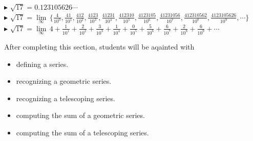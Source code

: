 \documentclass{ximera}
\begin{document}
$\blacktriangleright$  $\sqrt{17} = 0.123105626\cdots$ \\



$\blacktriangleright$ $\sqrt{17} =  \lim\limits_{\infty} \, \{ \frac{4}{10^0}, \frac{41}{10^1},  \frac{412}{10^2}, \frac{4123}{10^3}, \frac{41231}{10^4}, \frac{412310}{10^5}, \frac{4123105}{10^6}, \frac{41231056}{10^7}, \frac{412310562}{10^8}, \frac{4123105626}{10^9}, \cdots \}$ \\



$\blacktriangleright$ $\sqrt{17} = \lim\limits_{\infty} \, 4 + \frac{1}{10^1} + \frac{2}{10^2} + \frac{3}{10^3} + \frac{1}{10^4} + \frac{0}{10^5} + \frac{5}{10^6} + \frac{6}{10^7} + \frac{2}{10^8} + \frac{6}{10^9} + \cdots$ \\




















\begin{sectionOutcomes}

After completing this section, students will be aqainted with

\begin{itemize}
\item defining a series.
\item recognizing a geometric series.
\item recognizing a telescoping series.
\item computing the sum of a geometric series.
\item computing the sum of a telescoping series.
\end{itemize}

\end{sectionOutcomes}
\end{document}
